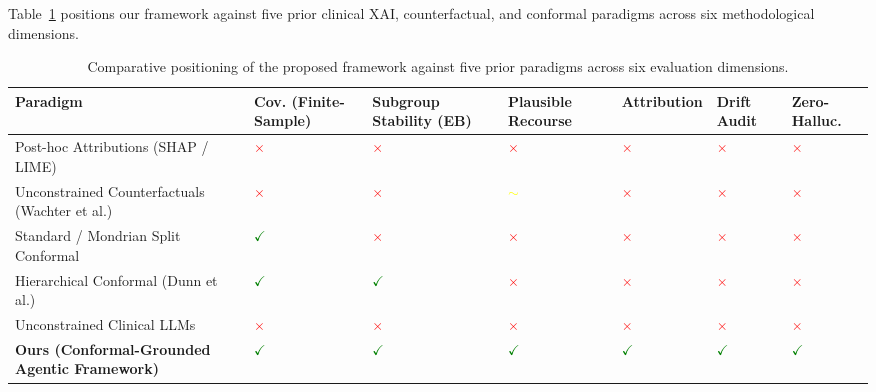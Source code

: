 \documentclass[11pt,a4paper]{article}
\theoremstyle{plain}
\begin{document}
Table~\ref{tab:positioning} positions our framework against five prior clinical XAI, counterfactual, and conformal paradigms across six methodological dimensions.

\begin{table}[htbp]
\centering
\footnotesize
\setlength{\tabcolsep}{2pt}
\caption{Comparative positioning of the proposed framework against five prior paradigms across six evaluation dimensions.}
\label{tab:positioning}
\begin{tabular}{p{3.0cm}p{1.7cm}p{1.7cm}p{1.7cm}p{1.7cm}p{1.7cm}p{1.7cm}}
\toprule
Paradigm & Cov. (Finite-Sample) & Subgroup Stability (EB) & Plausible Recourse & Attribution & Drift Audit & Zero-Halluc. \\
\midrule
Post-hoc Attributions (SHAP / LIME) & \textcolor{red}{$\times$} & \textcolor{red}{$\times$} & \textcolor{red}{$\times$} & \textcolor{red}{$\times$} & \textcolor{red}{$\times$} & \textcolor{red}{$\times$} \\
Unconstrained Counterfactuals (Wachter et al.) & \textcolor{red}{$\times$} & \textcolor{red}{$\times$} & \textcolor{yellow}{$\sim$} & \textcolor{red}{$\times$} & \textcolor{red}{$\times$} & \textcolor{red}{$\times$} \\
Standard / Mondrian Split Conformal & \textcolor{green}{$\checkmark$} & \textcolor{red}{$\times$} & \textcolor{red}{$\times$} & \textcolor{red}{$\times$} & \textcolor{red}{$\times$} & \textcolor{red}{$\times$} \\
Hierarchical Conformal (Dunn et al.) & \textcolor{green}{$\checkmark$} & \textcolor{green}{$\checkmark$} & \textcolor{red}{$\times$} & \textcolor{red}{$\times$} & \textcolor{red}{$\times$} & \textcolor{red}{$\times$} \\
Unconstrained Clinical LLMs & \textcolor{red}{$\times$} & \textcolor{red}{$\times$} & \textcolor{red}{$\times$} & \textcolor{red}{$\times$} & \textcolor{red}{$\times$} & \textcolor{red}{$\times$} \\
\textbf{Ours (Conformal-Grounded Agentic Framework)} & \textcolor{green}{$\checkmark$} & \textcolor{green}{$\checkmark$} & \textcolor{green}{$\checkmark$} & \textcolor{green}{$\checkmark$} & \textcolor{green}{$\checkmark$} & \textcolor{green}{$\checkmark$} \\
\bottomrule
\end{tabular}
\end{table}



\end{document}
